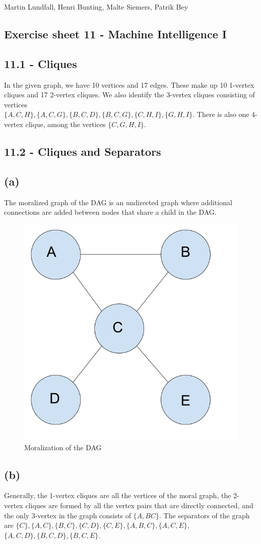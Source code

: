 \documentclass[11pt,a4paper]{article}
\begin{document}
	\noindent
	Martin Lundfall, Henri Bunting, Malte Siemers, Patrik Bey
	\begin{centering}
		\section*{Exercise sheet 11 - Machine Intelligence I}
	\end{centering}
	\subsection*{11.1 - Cliques}
	In the given graph, we have 10 vertices and 17 edges. These make up 10 1-vertex cliques and 17 2-vertex cliques. We also identify the 3-vertex cliques consisting of vertices\\ $\{A,C,H\},\{A, C, G\},\{B, C, D\}, \{B, C, G\}, \{C, H, I\}, \{G, H, I\}$. There is also one 4-vertex clique, among the vertices $\{C, G, H, I\}$.
	\subsection*{11.2 - Cliques and Separators}
	\subsection*{(a)}
	The moralized graph of the DAG is an undirected graph where additional connections are added between nodes that share a child in the DAG.
	\begin{figure}[h]
		\caption{Moralization of the DAG}
		\centering
		\includegraphics[width=.7\textwidth]{moral}
	\end{figure}
	\subsection*{(b)}
	Generally, the 1-vertex cliques are all the vertices of the moral graph, the 2-vertex cliques are formed by all the vertex pairs that are directly connected, and the only 3-vertex in the graph consists of $\{A, B C\}$. The separators of the graph are $\{C\}, \{A, C\}, \{B, C\}, \{C, D\}, \{C, E\}, \{A, B, C\}, \{A, C, E\},$\\$ \{A, C, D\}, \{B, C, D\}, \{B, C, E\}$.
	
\end{document}
